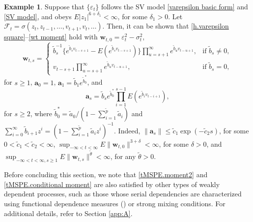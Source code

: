 \documentclass[ejsv2]{imsart}
\theoremstyle{plain}
\theoremstyle{definition}
\newtheorem{example}{Example}[section]
\theoremstyle{remark}
\begin{document}
\begin{example}\label{remark3.2}
Suppose that $\{\varepsilon_t\}$ follows the SV model 
\eqref{varepsilon basic form} and
\eqref{SV model}, and obeys $E|z_1|^{6+\delta_1}<\infty$, for some $\delta_1>0$. Let $\mathcal{F}_{t}=\sigma(z_t,z_{t-1},\ldots,v_{t+1},v_t,\ldots)$. Then,
it can be shown that \eqref{h.varepsilon square}--\eqref{wt moment} hold with $\bm{w}_{t,0}=\varepsilon_t^2-\sigma_t^2$,
\begin{equation}\label{SV wts}
\bm{w}_{t,s}=
\begin{cases}
  \tilde{b}_s^{-1}\{e^{\tilde{b}_sv_{t-s+1}}-E(e^{\tilde{b}_sv_{t-s+1}})\}\prod_{u=s+1}^{\infty}e^{\tilde{b}_uv_{t-u+1}}, & \mbox{if } \tilde{b}_s\neq0, \\
  v_{t-s+1}\prod_{u=s+1}^{\infty}e^{\tilde{b}_uv_{t-u+1}}, & \mbox{if } \tilde{b}_s=0,
\end{cases}
\end{equation}
for $s\geq1$, $\mathbf{a}_0=1$, $\mathbf{a}_1=\tilde{b}_1e^{\tilde{b}_0^\ast}$, and
\begin{equation}\label{SV as}
\mathbf{a}_s=\tilde{b}_se^{\tilde{b}_0^\ast}\prod_{i=1}^{s-1}E(e^{\tilde{b}_iv_{t-i+1}}),
\end{equation}
for $s\geq2$, where $\tilde{b}^\ast_0=\tilde{a}_0/(1-\sum_{i=1}^{\tilde{p}}\tilde{a}_i)$ and $\sum_{i=0}^{\infty}\tilde{b}_{i+1}z^i=(1-\sum_{i=1}^{\tilde{p}}\tilde{a}_iz^i)^{-1}$. Indeed, $\lVert \mathbf{a}_s\rVert\leq \tilde{c}_1\exp(-\tilde{c}_2s)$, for some $0<\tilde{c}_1<\tilde{c}_2<\infty$, $\sup_{-\infty<t<\infty}E\lVert \bm{w}_{t,0}\rVert^{3+\delta}<\infty$, for some $\delta>0$, and $\sup_{-\infty<t<\infty,s\geq1}E\lVert \bm{w}_{t,s}\rVert^{\tilde{\theta}}<\infty$, for any $\tilde{\theta}>0$.
\end{example}


Before concluding this section, we note that
\eqref{tMSPE.moment2} and \eqref{tMSPE.conditional moment}
are also satisfied by other types of weakly dependent processes, such as those whose serial dependencies are characterized using functional dependence measures
(\cite{Wu2005Main}) or strong mixing conditions. For additional details, refer to Section \ref{app:A}.
\end{document}
